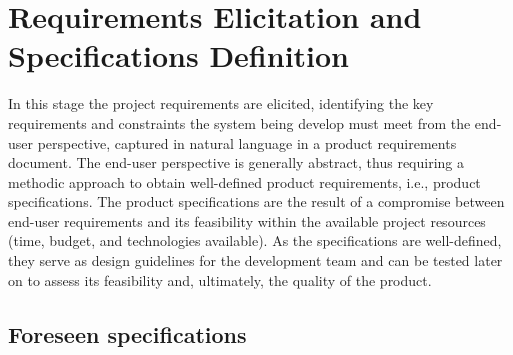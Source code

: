 \chapter{Requirements Elicitation and Specifications Definition}%
\label{ch:requirements-specs}
In this stage the project requirements are elicited, identifying the key
requirements and constraints the system being develop must meet from the
end-user perspective, captured in natural language in a product requirements
document. The end-user perspective is generally abstract, thus requiring a
methodic approach to obtain well-defined product requirements, i.e., product
specifications. The product specifications are the result of a compromise
between end-user requirements and its feasibility within the available project
resources (time, budget, and technologies available). As the specifications are
well-defined, they serve as design guidelines for the development team and can
be tested later on to assess its feasibility and, ultimately, the quality of the product.
%
%
\section{Foreseen specifications}%
\label{sec:fores-spec}

%

